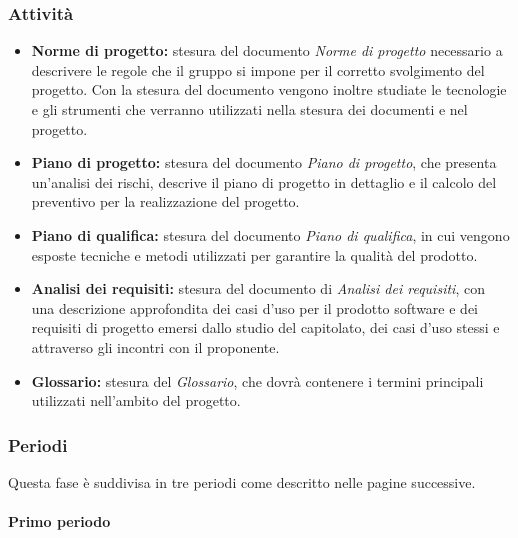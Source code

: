 \subsubsection{Attività}\label{sec:pianificazione:analisi:attivita}
\begin{itemize}
    \item \textbf{Norme di progetto:} stesura del documento \textit{Norme di progetto} necessario a descrivere le regole che il gruppo si impone per il corretto svolgimento del progetto. Con la stesura del documento vengono inoltre studiate le tecnologie e gli strumenti che verranno utilizzati nella stesura dei documenti e nel progetto.
    \item \textbf{Piano di progetto:} stesura del documento \textit{Piano di progetto}, che presenta un'analisi dei rischi, descrive il piano di progetto in dettaglio e il calcolo del preventivo per la realizzazione del progetto.
    \item \textbf{Piano di qualifica:} stesura del documento \textit{Piano di qualifica}, in cui vengono esposte tecniche e metodi utilizzati per garantire la qualità del prodotto.
    \item \textbf{Analisi dei requisiti:} stesura del documento di \textit{Analisi dei requisiti}, con una descrizione approfondita dei casi d'uso per il prodotto software e dei requisiti di progetto emersi dallo studio del capitolato, dei casi d'uso stessi e attraverso gli incontri con il proponente.
    \item \textbf{Glossario:} stesura del \textit{Glossario}, che dovrà contenere i termini principali utilizzati nell'ambito del progetto.
\end{itemize}


\subsubsection{Periodi}\label{sec:pianificazione:analisi:periodi}
Questa fase è suddivisa in tre periodi come descritto nelle pagine successive.

\newpage

\paragraph{Primo periodo}\label{sec:pianificazione:analisi:periodi:primo}

